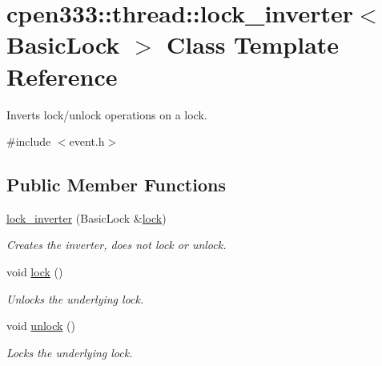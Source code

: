 \hypertarget{classcpen333_1_1thread_1_1lock__inverter}{}\section{cpen333\+:\+:thread\+:\+:lock\+\_\+inverter$<$ Basic\+Lock $>$ Class Template Reference}
\label{classcpen333_1_1thread_1_1lock__inverter}


Inverts lock/unlock operations on a lock.  




{\ttfamily \#include $<$event.\+h$>$}

\subsection*{Public Member Functions}
\begin{DoxyCompactItemize}
\item 
\hyperlink{classcpen333_1_1thread_1_1lock__inverter_a0da2124d7f554577aa612c63ac9f74bf}{lock\+\_\+inverter} (Basic\+Lock \&\hyperlink{classcpen333_1_1thread_1_1lock__inverter_a35bd789432239cd8c9beb0e9b40811d8}{lock})
\begin{DoxyCompactList}\small\item\em Creates the inverter, does not lock or unlock. \end{DoxyCompactList}\item 
\mbox{\label{classcpen333_1_1thread_1_1lock__inverter_a35bd789432239cd8c9beb0e9b40811d8}} 
void \hyperlink{classcpen333_1_1thread_1_1lock__inverter_a35bd789432239cd8c9beb0e9b40811d8}{lock} ()
\begin{DoxyCompactList}\small\item\em Unlocks the underlying lock. \end{DoxyCompactList}\item 
\mbox{\label{classcpen333_1_1thread_1_1lock__inverter_ae66d4cf112d29ad1b043e4a467a601d3}} 
void \hyperlink{classcpen333_1_1thread_1_1lock__inverter_ae66d4cf112d29ad1b043e4a467a601d3}{unlock} ()
\begin{DoxyCompactList}\small\item\em Locks the underlying lock. \end{DoxyCompactList}\end{DoxyCompactItemize}


